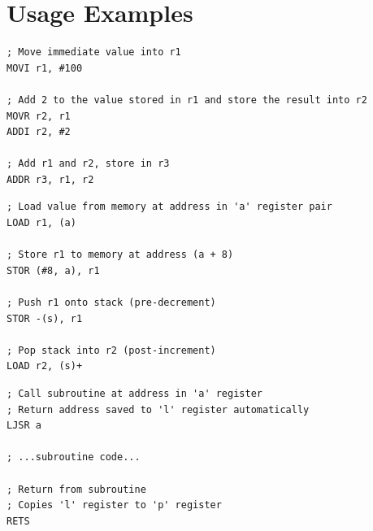 \section{Usage Examples}

\begin{example}
	\begin{lstlisting}
; Move immediate value into r1
MOVI r1, #100

; Add 2 to the value stored in r1 and store the result into r2
MOVR r2, r1
ADDI r2, #2

; Add r1 and r2, store in r3
ADDR r3, r1, r2
	\end{lstlisting}
	\caption{Basic Register Operations}
\end{example}

\begin{example}
	\begin{lstlisting}
; Load value from memory at address in 'a' register pair
LOAD r1, (a)

; Store r1 to memory at address (a + 8)
STOR (#8, a), r1

; Push r1 onto stack (pre-decrement)
STOR -(s), r1

; Pop stack into r2 (post-increment)
LOAD r2, (s)+

	\end{lstlisting}
	\caption{Address Register Usage}
\end{example}

\begin{example}
	\begin{lstlisting}
; Call subroutine at address in 'a' register
; Return address saved to 'l' register automatically
LJSR a

; ...subroutine code...

; Return from subroutine
; Copies 'l' register to 'p' register
RETS
	\end{lstlisting}
	\caption{Subroutine Call}
\end{example}
